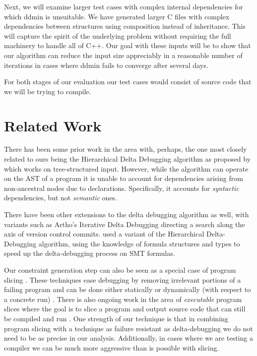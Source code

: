 \documentclass[preprint]{acm_proc_article-sp}
\begin{document}
Next, we will examine larger test cases with complex internal dependencies for
which ddmin is unsuitable.  We have generated larger C files with complex
dependencies between structures using composition instead of inheritance.  This
will capture the spirit of the underlying problem without requiring the full
machinery to handle all of C++.  Our goal with these inputs will be to show that
our algorithm can reduce the input size appreciably in a reasonable number of
iterations in cases where ddmin fails to converge after several days. 


For both stages of our evaluation our test cases would consist of source code
that we will be trying to compile.


\section{Related Work}



There has been some prior work in the area with, perhaps, the one most closely
related to ours being the Hierarchical Delta Debugging algorithm as proposed by
\citet{hdd} which works on tree-structured input. However, while
the algorithm can operate on the AST of a program it is unable to account for
dependencies arising from non-ancestral nodes due to declarations. Specifically,
it accounts for \emph{syntactic} dependencies, but not \emph{semantic} ones.

There have been other extensions to the delta debugging algorithm as well, with
variants such as Artho's Iterative Delta Debugging \citep{idd} directing a search
along the axis of version control commits. \citet{smt} used a
variant of the Hierarchical Delta-Debugging algorithm, using the knowledge of
formula structures and types to speed up the delta-debugging process on SMT
formulas.

Our constraint generation step can also be seen as a special case of program
slicing \citep{weiser81} \citep{tip94}. These techniques ease debugging by
removing irrelevant portions of a failing program and can be done either
statically or dynamically (with respect to a concrete run)
\citep{agrawal90}. There is also ongoing work in the area of \emph{executable}
program slices where the goal is to slice a program and output source code
that can still be compiled and run \citep{horwitz10}. One strength of our
technique is that in combining program slicing with a technique as failure
resistant as delta-debugging we do not need to be as precise in our
analysis. Additionally, in cases where we are testing a compiler we can be much
more aggressive than is possible with slicing.
\end{document}
